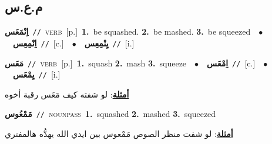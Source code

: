 \documentclass[10pt,a4paper,twoside]{article} %
\begin{document}
\begin{multicols}{2}
\vspace{-3mm}
\subsection*{\color{blue}\foreignlanguage{arabic}{م.ع.س}\color{blue}{}} 

{\setlength\topsep{0pt}\textbf{\foreignlanguage{arabic}{اِنْمَعَس}}\ {\color{gray}\texttt{//}\color{black}}\ \textsc{verb}\ [p.]\ \textbf{1.}~be squashed.  \textbf{2.}~be mashed.  \textbf{3.}~be squeezed\ \ $\bullet$\ \ \setlength\topsep{0pt}\textbf{\foreignlanguage{arabic}{اِنْمِعِس}}\ {\color{gray}\texttt{//}\color{black}}\ [c.]\ \ $\bullet$\ \ \setlength\topsep{0pt}\textbf{\foreignlanguage{arabic}{يِنْمِعِس}}\ {\color{gray}\texttt{//}\color{black}}\ [i.]\ } \vspace{2mm}

{\setlength\topsep{0pt}\textbf{\foreignlanguage{arabic}{مَعَس}}\ {\color{gray}\texttt{//}\color{black}}\ \textsc{verb}\ [p.]\ \textbf{1.}~squash  \textbf{2.}~mash  \textbf{3.}~squeeze\ \ $\bullet$\ \ \setlength\topsep{0pt}\textbf{\foreignlanguage{arabic}{اِمْعَس}}\ {\color{gray}\texttt{//}\color{black}}\ [c.]\ \ $\bullet$\ \ \setlength\topsep{0pt}\textbf{\foreignlanguage{arabic}{يِمْعَس}}\ {\color{gray}\texttt{//}\color{black}}\ [i.]\  \begin{flushright}\color{gray}\foreignlanguage{arabic}{\textbf{\underline{\foreignlanguage{arabic}{أمثلة}}}: لو شفته كيف مَعَس رقبة أخوه}\end{flushright}\color{black}} \vspace{2mm}

{\setlength\topsep{0pt}\textbf{\foreignlanguage{arabic}{مَمْعُوس}}\ {\color{gray}\texttt{//}\color{black}}\ \textsc{noun\textunderscore pass}\ \textbf{1.}~squashed  \textbf{2.}~mashed  \textbf{3.}~squeezed\  \begin{flushright}\color{gray}\foreignlanguage{arabic}{\textbf{\underline{\foreignlanguage{arabic}{أمثلة}}}: لو شفت منظر الصوص مَمْعوس بين ايدي الله يهدُّه هالمفتري}\end{flushright}\color{black}} \vspace{2mm}


\end{multicols}
\end{document}
